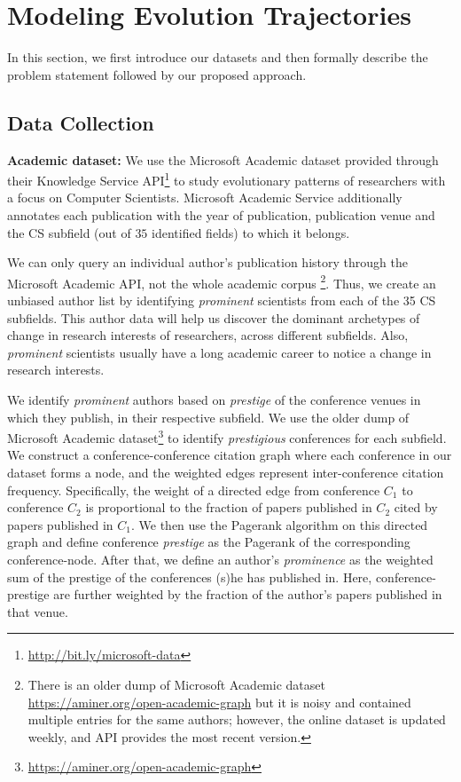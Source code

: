 
\section{Modeling Evolution Trajectories}
\label{sec:model}
In this section, we first introduce our datasets and then formally describe the problem statement followed by our proposed approach.

\subsection{Data Collection}
\textbf{Academic dataset:}
We use the Microsoft Academic dataset \cite{Sinha:2015} provided through their Knowledge Service API\footnote{\url{http://bit.ly/microsoft-data}} to study evolutionary patterns of researchers with a focus on Computer Scientists.
Microsoft Academic Service additionally annotates each publication with the year of publication, publication venue and the CS subfield (out of $35$ identified fields) to which it belongs.

We can only query an individual author's publication history through the Microsoft Academic API, not the whole academic corpus \footnote{There is an older dump of Microsoft Academic dataset \url{https://aminer.org/open-academic-graph} but it is noisy and contained multiple entries for the same authors; however, the online dataset is updated weekly, and API provides the most recent version.}. Thus, we create an unbiased author list by identifying \emph{prominent} scientists from each of the 35 CS subfields. This author data will help us discover the dominant archetypes of change in research interests of researchers, across different subfields. Also, \emph{prominent} scientists usually have a long academic career to notice a change in research interests.

We identify \emph{prominent} authors based on \emph{prestige} of the conference venues in which they publish, in their respective subfield. We use the older dump of Microsoft Academic dataset\footnote{\url{https://aminer.org/open-academic-graph}} to identify \emph{prestigious} conferences for each subfield. We construct a conference-conference citation graph where each conference in our dataset forms a node, and the weighted edges represent inter-conference citation frequency. Specifically, the weight of a directed edge from conference $C_1$ to conference $C_2$ is proportional to the fraction of papers published in $C_2$ cited by papers published in $C_1$. We then use the Pagerank algorithm \citep{ilprints422} on this directed graph and define conference \emph{prestige} as the Pagerank of the corresponding conference-node. After that, we define an author's \emph{prominence} as the weighted sum of the prestige of the conferences (s)he has published in. Here, conference-prestige are further weighted by the fraction of the author's papers published in that venue.

